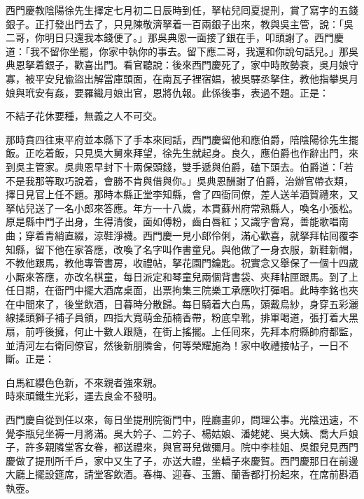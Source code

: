 西門慶教陰陽徐先生擇定七月初二日辰時到任，拏帖兒囘夏提刑，賞了寫字的五錢銀子。正打發出門去了，只見陳敬濟拏着一百兩銀子出來，教與吳主管，說：「吳二哥，你明日只還我本錢便了。」那吳典恩一面接了銀在手，叩頭謝了。西門慶道：「我不留你坐罷，你家中執你的事去。留下應二哥，我還和你說句話兒。」那吳典恩拏着銀子，歡喜出門。看官聽說：後來西門慶死了，家中時敗勢衰，吳月娘守寡，被平安兒偸盜出解當庫頭面，在南瓦子裡宿娼，被吳驛丞拏住，教他指攀吳月娘與玳安有姦，要羅織月娘出官，恩將仇報。此係後事，表過不題。正是：

\begin{myquote}
不結子花休要種，無義之人不可交。
\end{myquote}

那時賁四往東平府並本縣下了手本來囘話，西門慶留他和應伯爵，陪陰陽徐先生擺飯。正吃着飯，只見吳大舅來拜望，徐先生就起身。良久，應伯爵也作辭出門，來到吳主管家。吳典恩早封下十兩保頭錢，雙手遞與伯爵，磕下頭去。伯爵道：「若不是我那等取巧說着，會勝不肯與借與你。」{}吳典恩酬謝了伯爵，治辦官帶衣類，擇日見官上任不題。那時本縣正堂李知縣，會了四衙同僚，差人送羊酒賀禮來，又拏帖兒送了一名小郎來答應。年方一十八歲，本貫蘇州府常熟縣人，喚名小張松。原是縣中門子出身，生得清俊，面如傅粉，齒白唇紅；又識字會寫，善能歌唱南曲；穿着青綃直綴，涼鞋淨襪。西門慶一見小郎伶俐，滿心歡喜，就拏拜帖囘覆李知縣，留下他在家答應，改喚了名字叫作書童兒。與他做了一身衣服，新鞋新帽，不教他跟馬，教他專管書房，收禮帖，拏花園門鑰匙。祝實念又舉保了一個十四歲小厮來答應，亦改名棋童，每日派定和琴童兒兩個背書袋、夾拜帖匣跟馬。到了上任日期，在衙門中擺大酒席桌面，出票拘集三院樂工承應吹打彈唱。此時李銘也夾在中間來了，後堂飲酒，日暮時分散歸。每日騎着大白馬，頭戴烏紗，身穿五彩灑線揉頭獅子補子員領，四指大寬萌金茄楠香帶，粉底皁靴，排軍喝道，張打着大黑扇，前呼後擁，何止十數人跟隨，在街上搖擺。{}上任囘來，先拜本府縣帥府都監，並清河左右衛同僚官，然後新朋隣舍，何等榮耀施為！家中收禮接帖子，一日不斷。正是：

\begin{myquote}
白馬紅纓色色新，不來親者強來親。\\時來頑鐵生光彩，運去良金不發明。
\end{myquote}

西門慶自從到任以來，每日坐提刑院衙門中，陞廳畫卯，問理公事。光陰迅速，不覺李瓶兒坐褥一月將滿。吳大妗子、二妗子、楊姑娘、潘姥姥、吳大姨、喬大戶娘子，許多親隣堂客女眷，都送禮來，與官哥兒做彌月。院中李桂姐、吳銀兒見西門慶做了提刑所千戶，家中又生了子，亦送大禮，坐轎子來慶賀。西門慶那日在前邊大廳上擺設筵席，請堂客飲酒。春梅、迎春、玉簫、蘭香都打扮起來，在席前斟酒執壺。


